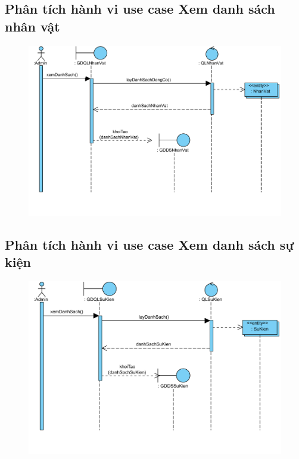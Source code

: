 \documentclass[3p]{elsarticle}
\begin{document}
\subsection{Phân tích hành vi use case Xem danh sách nhân vật}
\begin{figure}[!htbp]
	\hspace*{-.5in}
	\centering
	\includegraphics[scale=.55]{images/sequence-pdfs/admin/viewListCharacter.pdf}
\end{figure}
\newpage

\subsection{Phân tích hành vi use case Xem danh sách sự kiện}
\begin{figure}[!htbp]
	\hspace*{-.5in}
	\centering
	\includegraphics[scale=.55]{images/sequence-pdfs/admin/viewListEvent.pdf}
\end{figure}
\newpage
\end{document}
